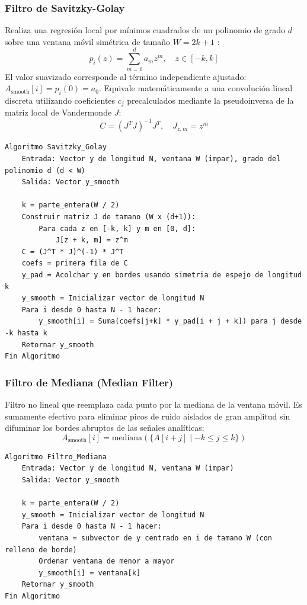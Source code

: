 \subsubsection{Filtro de Savitzky-Golay}
Realiza una regresión local por mínimos cuadrados de un polinomio de grado $d$ sobre una ventana móvil simétrica de tamaño $W = 2k + 1$ \cite{savitzky1964}:
\begin{equation}
    p_i(z) = \sum_{m=0}^{d} a_m z^m, \quad z \in [-k, k]
\end{equation}
El valor suavizado corresponde al término independiente ajustado: $A_{\text{smooth}}[i] = p_i(0) = a_0$. Equivale matemáticamente a una convolución lineal discreta utilizando coeficientes $c_j$ precalculados mediante la pseudoinversa de la matriz local de Vandermonde $J$:
\begin{equation}
    C = (J^T J)^{-1} J^T, \quad J_{z, m} = z^m
\end{equation}

\begin{lstlisting}[caption=Algoritmo de Savitzky-Golay]
Algoritmo Savitzky_Golay
    Entrada: Vector y de longitud N, ventana W (impar), grado del polinomio d (d < W)
    Salida: Vector y_smooth

    k = parte_entera(W / 2)
    Construir matriz J de tamano (W x (d+1)):
        Para cada z en [-k, k] y m en [0, d]:
            J[z + k, m] = z^m
    C = (J^T * J)^(-1) * J^T
    coefs = primera fila de C
    y_pad = Acolchar y en bordes usando simetria de espejo de longitud k
    y_smooth = Inicializar vector de longitud N
    Para i desde 0 hasta N - 1 hacer:
        y_smooth[i] = Suma(coefs[j+k] * y_pad[i + j + k]) para j desde -k hasta k
    Retornar y_smooth
Fin Algoritmo
\end{lstlisting}

\subsubsection{Filtro de Mediana (Median Filter)}
Filtro no lineal que reemplaza cada punto por la mediana de la ventana móvil. Es sumamente efectivo para eliminar picos de ruido aislados de gran amplitud sin difuminar los bordes abruptos de las señales analíticas:
\begin{equation}
    A_{\text{smooth}}[i] = \text{mediana} \left( \{A[i + j] \mid -k \le j \le k\} \right)
\end{equation}

\begin{lstlisting}[caption=Algoritmo de Filtro de Mediana]
Algoritmo Filtro_Mediana
    Entrada: Vector y de longitud N, ventana W (impar)
    Salida: Vector y_smooth

    k = parte_entera(W / 2)
    y_smooth = Inicializar vector de longitud N
    Para i desde 0 hasta N - 1 hacer:
        ventana = subvector de y centrado en i de tamano W (con relleno de borde)
        Ordenar ventana de menor a mayor
        y_smooth[i] = ventana[k]
    Retornar y_smooth
Fin Algoritmo
\end{lstlisting}

